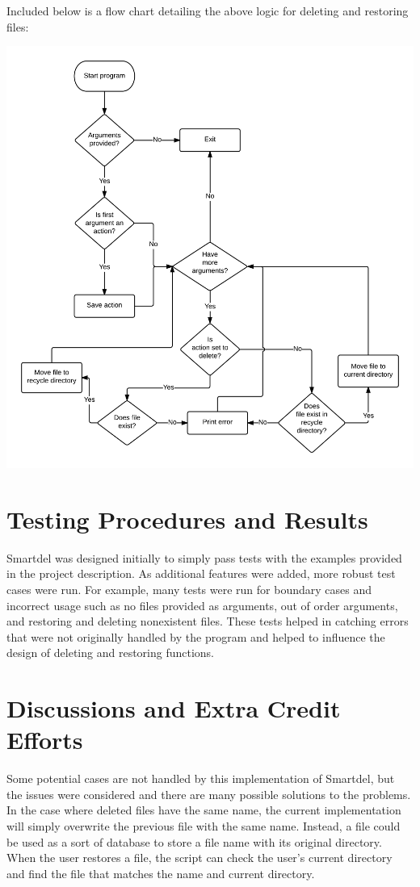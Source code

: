 \documentclass[12pt]{article}
\begin{document}
Included below is a flow chart detailing the above logic for deleting and restoring files:

\includegraphics[width=\linewidth]{img/flow-chart}

\section{Testing Procedures and Results}

Smartdel was designed initially to simply pass tests with the examples provided in the project description. As additional features
were added, more robust test cases were run. For example, many tests were run for boundary cases and incorrect usage such as
no files provided as arguments, out of order arguments, and restoring and deleting nonexistent files. These tests helped in catching
errors that were not originally handled by the program and helped to influence the design of deleting and restoring functions.
 
\section{Discussions and Extra Credit Efforts}

Some potential cases are not handled by this implementation of Smartdel, but the issues were considered and there are many possible
solutions to the problems. In the case where deleted files have the same name, the current implementation will simply overwrite the
previous file with the same name. Instead, a file could be used as a sort of database to store a file name with its original directory. When
the user restores a file, the script can check the user's current directory and find the file that matches the name and current directory.
\end{document}
